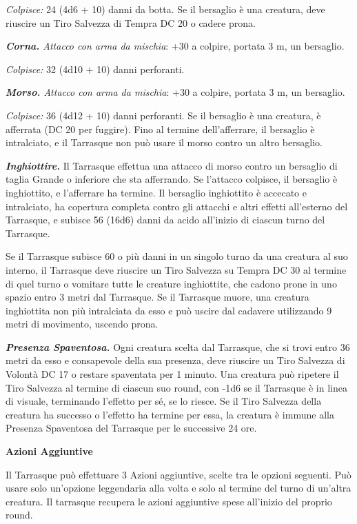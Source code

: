 \begin{multicols}{2}
\textit{Colpisce:} 24 (4d6 + 10) danni da botta. Se il bersaglio è una creatura, deve riuscire un Tiro Salvezza di Tempra DC 20 o cadere prona.

\textit{\textbf{Corna.} Attacco con arma da mischia}: +30 a colpire, portata 3 m, un bersaglio.

\textit{Colpisce:} 32 (4d10 + 10) danni perforanti.

\textit{\textbf{Morso.} Attacco con arma da mischia}: +30 a colpire, portata 3 m, un bersaglio.

\textit{Colpisce:} 36 (4d12 + 10) danni perforanti. Se il bersaglio è una creatura, è afferrata (DC 20 per fuggire). Fino al termine dell'afferrare, il bersaglio è intralciato, e il Tarrasque non può usare il morso contro un altro bersaglio.

\textit{\textbf{Inghiottire.}} Il Tarrasque effettua una attacco di morso contro un bersaglio di taglia Grande o inferiore che sta afferrando. Se l'attacco colpisce, il bersaglio è inghiottito, e l'afferrare ha termine. Il bersaglio inghiottito è accecato e intralciato, ha copertura completa contro gli attacchi e altri effetti all'esterno del Tarrasque, e subisce 56 (16d6) danni da acido all'inizio di ciascun turno del Tarrasque.

Se il Tarrasque subisce 60 o più danni in un singolo turno da una creatura al suo interno, il Tarrasque deve riuscire un Tiro Salvezza su Tempra DC 30 al termine di quel turno o vomitare tutte le creature inghiottite, che cadono prone in uno spazio entro 3 metri dal Tarrasque. Se il Tarrasque muore, una creatura inghiottita non più intralciata da esso e può uscire dal cadavere utilizzando 9 metri di movimento, uscendo prona.

\textit{\textbf{Presenza Spaventosa.}} Ogni creatura scelta dal Tarrasque, che si trovi entro 36 metri da esso e consapevole della sua presenza, deve riuscire un Tiro Salvezza di Volontà DC 17 o restare spaventata per 1 minuto. Una creatura può ripetere il Tiro Salvezza al termine di ciascun suo round, con -1d6 se il Tarrasque è in linea di visuale, terminando l'effetto per sé, se lo riesce. Se il Tiro Salvezza della creatura ha successo o l'effetto ha termine per essa, la creatura è immune alla Presenza Spaventosa del Tarrasque per le successive 24 ore.

\textbf{Azioni Aggiuntive}

Il Tarrasque può effettuare 3 Azioni aggiuntive, scelte tra le opzioni seguenti. Può usare solo un'opzione leggendaria alla volta e solo al termine del turno di un'altra creatura. Il tarrasque recupera le azioni aggiuntive spese all'inizio del proprio round.


\end{multicols}
